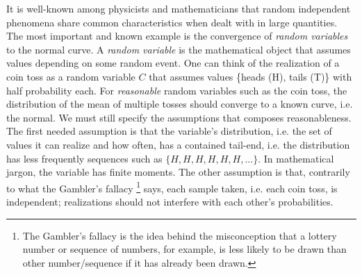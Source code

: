 It is well-known among physicists and mathematicians that random independent phenomena share common characteristics when dealt with in large quantities. The most important and known example is the convergence of \textit{random variables} to the normal curve. A \textit{random variable} is the mathematical object that assumes values depending on some random event. One can think of the realization of a coin toss as a random variable $C$ that assumes values \{heads (H), tails (T)\} with half probability each. For \textit{reasonable} random variables such as the coin toss, the distribution of the mean of multiple tosses should converge to a known curve, i.e. the normal. We must still specify the assumptions that composes reasonableness. The first needed assumption is that the variable's distribution, i.e. the set of values it can realize and how often,  has a contained tail-end, i.e. the distribution has less frequently sequences such as $\{H, H, H, H, H, H, \dots\}$. In mathematical jargon, the variable has finite moments. The other assumption is that, contrarily to what the Gambler's fallacy \footnote{The Gambler's fallacy is the idea behind the misconception that a lottery number or sequence of numbers, for example, is less likely to be drawn than other number/sequence if it has already been drawn.} says, each sample taken, i.e. each coin toss, is independent; realizations should not interfere with each other's probabilities.


